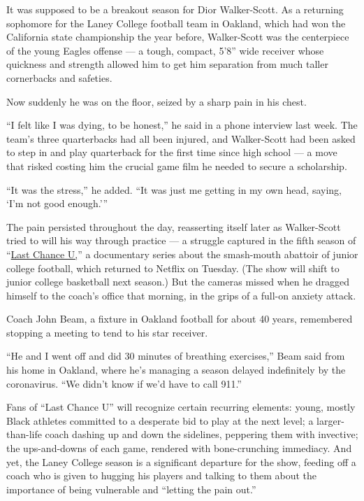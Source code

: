 It was supposed to be a breakout season for Dior Walker-Scott. As a
returning sophomore for the Laney College football team in Oakland,
which had won the California state championship the year before,
Walker-Scott was the centerpiece of the young Eagles offense --- a
tough, compact, 5'8'' wide receiver whose quickness and strength allowed
him to get him separation from much taller cornerbacks and safeties.

Now suddenly he was on the floor, seized by a sharp pain in his chest.

``I felt like I was dying, to be honest,'' he said in a phone interview
last week. The team's three quarterbacks had all been injured, and
Walker-Scott had been asked to step in and play quarterback for the
first time since high school --- a move that risked costing him the
crucial game film he needed to secure a scholarship.

``It was the stress,'' he added. ``It was just me getting in my own
head, saying, `I'm not good enough.'''

The pain persisted throughout the day, reasserting itself later as
Walker-Scott tried to will his way through practice --- a struggle
captured in the fifth season of
``\href{https://www.netflix.com/title/80091742}{Last Chance U,}'' a
documentary series about the smash-mouth abattoir of junior college
football, which returned to Netflix on Tuesday. (The show will shift to
junior college basketball next season.) But the cameras missed when he
dragged himself to the coach's office that morning, in the grips of a
full-on anxiety attack.

Coach John Beam, a fixture in Oakland football for about 40 years,
remembered stopping a meeting to tend to his star receiver.

``He and I went off and did 30 minutes of breathing exercises,'' Beam
said from his home in Oakland, where he's managing a season delayed
indefinitely by the coronavirus. ``We didn't know if we'd have to call
911.''

Fans of ``Last Chance U'' will recognize certain recurring elements:
young, mostly Black athletes committed to a desperate bid to play at the
next level; a larger-than-life coach dashing up and down the sidelines,
peppering them with invective; the ups-and-downs of each game, rendered
with bone-crunching immediacy. And yet, the Laney College season is a
significant departure for the show, feeding off a coach who is given to
hugging his players and talking to them about the importance of being
vulnerable and ``letting the pain out.''

